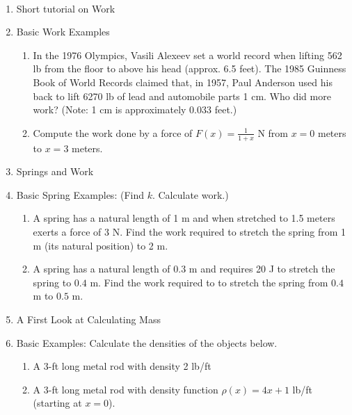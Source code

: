 \documentclass[11pt,fleqn]{article}
\begin{document}
\renewcommand{\headrulewidth}{0pt}
\newcommand{\blank}[1]{\rule{#1}{0.75pt}}
\newcommand{\bc}{\begin{center}}
\newcommand{\ec}{\end{center}}
\renewcommand{\d}{\displaystyle}

\vspace*{-0.7in}

\begin{center}
  \large
  \\
 
\end{center}

\begin{enumerate}
\item Short tutorial on Work

\vfill

\item Basic Work Examples
	\begin{enumerate}
	\item In the 1976 Olympics, Vasili Alexeev set a world record when lifting 562 lb from the floor to above his head (approx. 6.5 feet). The 1985 Guinness Book of World Records claimed that, in 1957, Paul Anderson used his back to lift 6270 lb of lead and automobile parts 1 cm. Who did more work? (Note: 1 cm is approximately 0.033 feet.)
	\vfill
	\item Compute the work done by a force of $F(x)=\frac{1}{1+x}$ N from $x=0$ meters to $x=3$ meters.
	\vfill
	\end{enumerate}
\item Springs and Work
\vfill
\newpage
\item Basic Spring Examples: (Find $k$. Calculate work.)\\
\begin{enumerate}
	\item A spring has a natural length of 1 m and when stretched to 1.5 meters exerts a force of 3 N. Find the work required to stretch the spring from 1 m (its natural position) to 2 m.\\
	\vfill
	\item A spring has a natural length of $0.3$ m and requires 20 J to stretch the spring to $0.4$ m. Find the work required to to stretch the spring from $0.4$ m  to $0.5$ m.
	\vfill
	\end{enumerate}

\item A First Look at Calculating Mass

\vfill

\item Basic Examples: Calculate the densities of the objects below.
	\begin{enumerate}
	\item A 3-ft long metal rod with density 2 lb/ft
	\vfill
	\item A 3-ft long metal rod with density function $\rho(x)=4x+1$ lb/ft (starting at $x=0$). 
	\vfill
	\end{enumerate} 
	
\end{enumerate}
\end{document}
